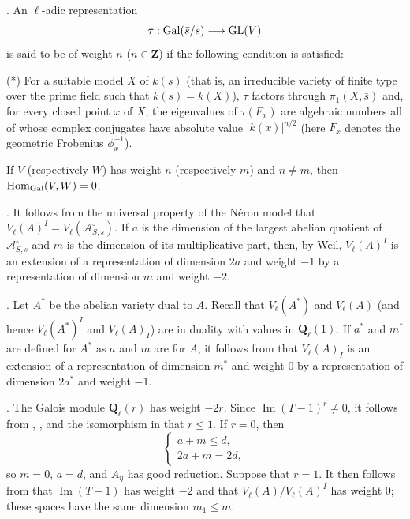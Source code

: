 . An $\ell$-adic representation
\[
 \tau:\operatorname{Gal}(\bar s/s)\longrightarrow\mathrm{GL}(V)
\]
is said to be of weight $n$ ($n\in\mathbf Z$) if the following condition
is satisfied:

(*) For a suitable model $X$ of $k(s)$ (that is, an irreducible variety
of finite type over the prime field such that $k(s)=k(X)$), $\tau$
factors through $\pi_1(X,\bar s)$ and, for every closed point $x$ of
$X$, the eigenvalues of $\tau(F_x)$ are algebraic numbers all of whose
complex conjugates have absolute value $|k(x)|^{n/2}$ (here $F_x$
denotes the geometric Frobenius $\phi_x^{-1}$).


If $V$ (respectively $W$) has weight $n$ (respectively $m$) and
$n\neq m$, then $\operatorname{Hom}_{\operatorname{Gal}}(V,W)=0$.

. It follows from the universal property of the N\'eron model that
$V_\ell(A)^I=V_\ell(\mathcal A^\circ_{S,s})$. If $a$ is the dimension
of the largest abelian quotient of $\mathcal A^\circ_{S,s}$ and $m$ is
the dimension of its multiplicative part, then, by Weil,
$V_\ell(A)^I$ is an extension of a representation of dimension $2a$ and
weight $-1$ by a representation of dimension $m$ and weight $-2$.

. Let $A^*$ be the abelian variety dual to $A$. Recall that
$V_\ell(A^*)$ and $V_\ell(A)$ (and hence $V_\ell(A^*)^I$ and
$V_\ell(A)_I$) are in duality with values in $\mathbf Q_\ell(1)$. If
$a^*$ and $m^*$ are defined for $A^*$ as $a$ and $m$ are for $A$, it
follows from  that $V_\ell(A)_I$ is an extension of a representation
of dimension $m^*$ and weight $0$ by a representation of dimension
$2a^*$ and weight $-1$.

. The Galois module $\mathbf Q_\ell(r)$ has weight $-2r$. Since
$\operatorname{Im}(T-1)^r\neq 0$, it follows from , , and the isomorphism in 
that $r\leq 1$. If $r=0$, then
\[
\left\{
\begin{array}{l}
a+m\leq d,\\[1ex]
2a+m=2d,
\end{array}
\right.
\]
so $m=0$, $a=d$, and $A_\eta$ has good reduction. Suppose that $r=1$.
It then follows from  that $\operatorname{Im}(T-1)$ has weight $-2$ and that
$V_\ell(A)/V_\ell(A)^I$ has weight $0$; these spaces have the same
dimension $m_1\leq m$.

